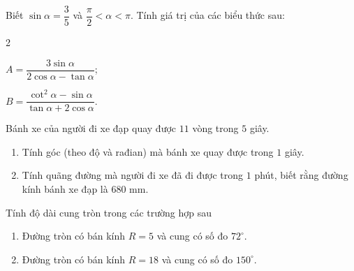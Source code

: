 \begin{bt}%
	Biết $\sin \alpha=\dfrac{3}{5}$ và $\dfrac{\pi}{2}<\alpha<\pi$. Tính giá trị của các biểu thức sau:
	\begin{enumEX}[a)]{2}
		\item $A=\dfrac{3 \sin \alpha}{2 \cos \alpha-\tan \alpha}$;
		\item $B=\dfrac{\cot ^2 \alpha-\sin \alpha}{\tan \alpha+2 \cos \alpha}$.
	\end{enumEX}
\end{bt}

\begin{bt}%
	Bánh xe của người đi xe đạp quay được $11$ vòng trong $5$ giây.
	\begin{enumerate}
		\item Tính góc (theo độ và rađian) mà bánh xe quay được trong $1$ giây.
		\item Tính quãng đường mà người đi xe đã đi được trong $1$ phút, biết rằng đường kính bánh xe đạp là $680$ mm.
	\end{enumerate}
\end{bt} 

\begin{bt}%
	Tính độ dài cung tròn trong các trường hợp sau
	\begin{enumerate}
		\item Đường tròn có bán kính  $ R=5 $ và cung có số đo $72^\circ$.
		\item Đường tròn có bán kính  $ R=18 $ và cung có số đo  $150^\circ$.
	\end{enumerate}
\end{bt} 

